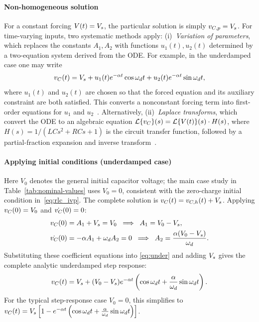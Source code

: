 \paragraph{Non-homogeneous solution}
For a constant forcing $V(t) = V_s$, the particular solution is simply
$v_{C,p} = V_s$.
For time-varying inputs, two systematic methods apply:
(i)~\emph{Variation of parameters}, which replaces the constants $A_1, A_2$
with functions $u_1(t), u_2(t)$ determined by a two-equation system derived
from the ODE.
For example, in the underdamped case one may write
\begin{equation}
  v_C(t) = V_s + u_1(t)e^{-\alpha t}\cos\omega_d t
    + u_2(t)e^{-\alpha t}\sin\omega_d t,
  \label{eq:vop_form}
\end{equation}
where $u_1(t)$ and $u_2(t)$ are chosen so that the forced equation and its
auxiliary constraint are both satisfied.
This converts a nonconstant forcing term into first-order equations for
$u_1$ and $u_2$~\cite{nilsson2019}.
Alternatively,
(ii)~\emph{Laplace transforms}, which convert the ODE to an algebraic equation
$\mathcal{L}\{v_C\}(s) = \mathcal{L}\{V(t)\}(s) \cdot H(s)$, where
$H(s) = 1/(LCs^2 + RCs + 1)$ is the circuit transfer function,
followed by a partial-fraction expansion and inverse transform~\cite{hayt2018}.

\paragraph{Applying initial conditions (underdamped case)}
Here $V_0$ denotes the general initial capacitor voltage; the main case
study in Table~\ref{tab:nominal-values} uses $V_0 = 0$, consistent with the
zero-charge initial condition in~\eqref{eq:rlc_ivp}.
The complete solution is $v_C(t) = v_{C,h}(t) + V_s$.
Applying $v_C(0) = V_0$ and $\dot{v_C}(0) = 0$:
\begin{align}
  v_C(0) &= A_1 + V_s = V_0 \;\implies\; A_1 = V_0 - V_s, \label{eq:ic1}\\
  \dot{v_C}(0) &= -\alpha A_1 + \omega_d A_2 = 0 \;\implies\;
                 A_2 = \frac{\alpha(V_0 - V_s)}{\omega_d}. \label{eq:ic2}
\end{align}
Substituting these coefficient equations into \eqref{eq:under} and adding
$V_s$ gives the complete analytic underdamped step response:
\begin{equation}
  v_C(t) = V_s + (V_0 - V_s)e^{-\alpha t}\left(
    \cos\omega_d t + \frac{\alpha}{\omega_d}\sin\omega_d t\right).
  \label{eq:underdamped_final}
\end{equation}
For the typical step-response case $V_0 = 0$, this simplifies to
$v_C(t) = V_s\left[1 - e^{-\alpha t}\left(\cos\omega_d t + \frac{\alpha}{\omega_d}\sin\omega_d t\right)\right]$.

